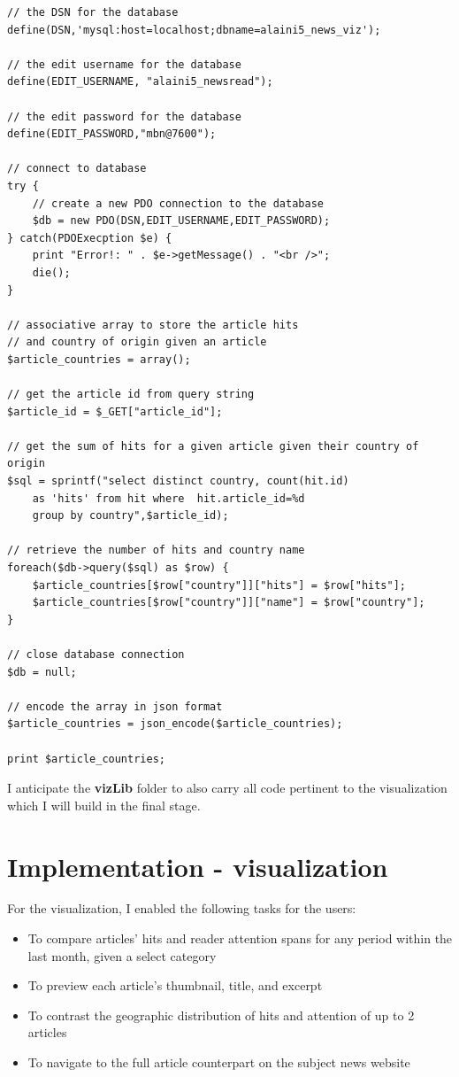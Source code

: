 \documentclass[12pt]{article}
\begin{document}
\begin{enumerate}
\begin{lstlisting}[basicstyle=\scriptsize]
// the DSN for the database
define(DSN,'mysql:host=localhost;dbname=alaini5_news_viz');

// the edit username for the database
define(EDIT_USERNAME, "alaini5_newsread");

// the edit password for the database
define(EDIT_PASSWORD,"mbn@7600");

// connect to database
try {
	// create a new PDO connection to the database
	$db = new PDO(DSN,EDIT_USERNAME,EDIT_PASSWORD);
} catch(PDOExecption $e) {
	print "Error!: " . $e->getMessage() . "<br />";
	die();
}

// associative array to store the article hits 
// and country of origin given an article
$article_countries = array();

// get the article id from query string
$article_id = $_GET["article_id"];

// get the sum of hits for a given article given their country of origin
$sql = sprintf("select distinct country, count(hit.id) 
	as 'hits' from hit where  hit.article_id=%d 
	group by country",$article_id);

// retrieve the number of hits and country name
foreach($db->query($sql) as $row) {
	$article_countries[$row["country"]]["hits"] = $row["hits"];
	$article_countries[$row["country"]]["name"] = $row["country"];
}

// close database connection
$db = null;

// encode the array in json format
$article_countries = json_encode($article_countries);

print $article_countries;
\end{lstlisting}

\end{enumerate}

\noindent I anticipate the \textbf{vizLib} folder to also carry all code pertinent to the visualization which I will build in the final stage. 

\section{Implementation - visualization}

For the visualization, I enabled the following tasks for the users:
\begin{itemize}
\item To compare articles' hits and reader attention spans for any period within the last month, given a select category
\item To preview each article's thumbnail, title, and excerpt
\item To contrast the geographic distribution of hits and attention of up to 2 articles
\item To navigate to the full article counterpart on the subject news website
\end{itemize}
\end{document}
